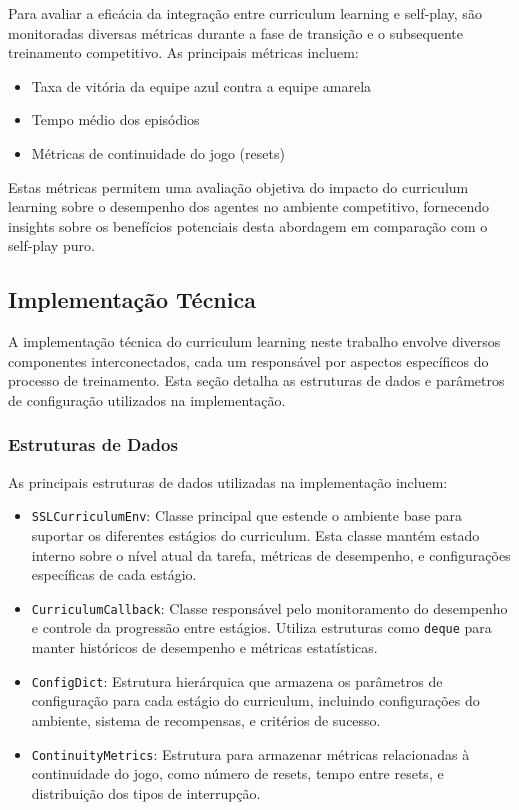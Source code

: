 Para avaliar a eficácia da integração entre curriculum learning e self-play, são monitoradas diversas métricas durante a fase de transição e o subsequente treinamento competitivo. As principais métricas incluem:

\begin{itemize}
    \item Taxa de vitória da equipe azul contra a equipe amarela
    \item Tempo médio dos episódios
    \item Métricas de continuidade do jogo (resets)
\end{itemize}

Estas métricas permitem uma avaliação objetiva do impacto do curriculum learning sobre o desempenho dos agentes no ambiente competitivo, fornecendo insights sobre os benefícios potenciais desta abordagem em comparação com o self-play puro.

\subsection{Implementação Técnica}
\label{subsec:implementacao_tecnica}

A implementação técnica do curriculum learning neste trabalho envolve diversos componentes interconectados, cada um responsável por aspectos específicos do processo de treinamento. Esta seção detalha as estruturas de dados e parâmetros de configuração utilizados na implementação.

\subsubsection{Estruturas de Dados}

As principais estruturas de dados utilizadas na implementação incluem:

\begin{itemize}
    \item \texttt{SSLCurriculumEnv}: Classe principal que estende o ambiente base para suportar os diferentes estágios do curriculum. Esta classe mantém estado interno sobre o nível atual da tarefa, métricas de desempenho, e configurações específicas de cada estágio.
    
    \item \texttt{CurriculumCallback}: Classe responsável pelo monitoramento do desempenho e controle da progressão entre estágios. Utiliza estruturas como \texttt{deque} para manter históricos de desempenho e métricas estatísticas.
    
    \item \texttt{ConfigDict}: Estrutura hierárquica que armazena os parâmetros de configuração para cada estágio do curriculum, incluindo configurações do ambiente, sistema de recompensas, e critérios de sucesso.
    
    \item \texttt{ContinuityMetrics}: Estrutura para armazenar métricas relacionadas à continuidade do jogo, como número de resets, tempo entre resets, e distribuição dos tipos de interrupção.
\end{itemize}

